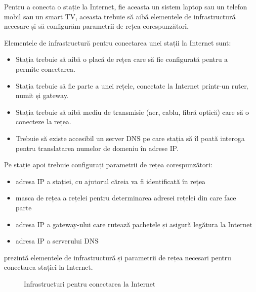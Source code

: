 Pentru a conecta o stație la Internet, fie aceasta un sistem laptop sau un telefon mobil sau un smart TV, aceasta trebuie să aibă elementele de infrastructură necesare și să configurăm parametrii de rețea corespunzători.

Elementele de infrastructură pentru conectarea unei stații la Internet sunt:

\begin{itemize}
  \item Stația trebuie să aibă o placă de rețea care să fie configurată pentru a permite conectarea.
  \item Stația trebuie să fie parte a unei rețele, conectate la Internet printr-un ruter, numit și gateway.
  \item Stația trebuie să aibă mediu de transmisie (aer, cablu, fibră optică) care să o conecteze la rețea.
  \item Trebuie să existe accesibil un server DNS pe care stația să îl poată interoga pentru translatarea numelor de domeniu în adrese IP.
\end{itemize}

Pe stație apoi trebuie configurați parametrii de rețea corespunzători:

\begin{itemize}
  \item adresa IP a stației, cu ajutorul căreia va fi identificată în rețea
  \item masca de rețea a rețelei  pentru determinarea adresei rețelei din care face parte
  \item adresa IP a gateway-ului care rutează pachetele și asigură legătura la Internet
  \item adresa IP a serverului DNS
\end{itemize}

 prezintă elementele de infrastructură și parametrii de rețea necesari pentru conectarea stației la Internet.

\begin{figure}[htbp]
  \centering
  \def\svgwidth{\columnwidth}
  
  \caption{Infrastructuri pentru conectarea la Internet}
  \label{fig:net:connect-infrastructure}
\end{figure}

